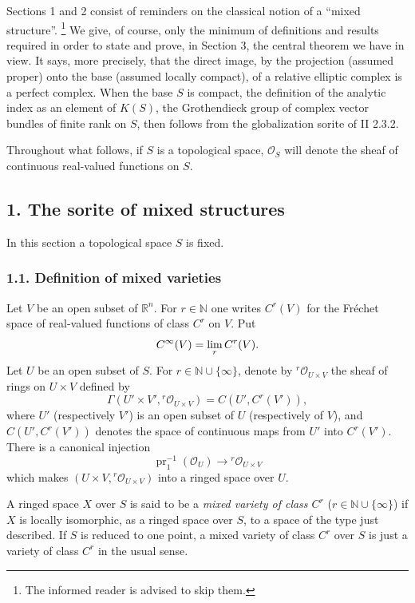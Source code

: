 \documentclass[11pt]{article}
\begin{document}
Sections 1 and 2 consist of reminders on the classical notion of a ``mixed structure''.
\footnote{The informed reader is advised to skip them.}
We give, of course, only the minimum of definitions and results required in order to state and prove, in Section 3, the central theorem we have in view. It says, more precisely, that the direct image, by the projection (assumed proper) onto the base (assumed locally compact), of a relative elliptic complex is a perfect complex. When the base $S$ is compact, the definition of the analytic index as an element of $K(S)$, the Grothendieck group of complex vector bundles of finite rank on $S$, then follows from the globalization sorite of II 2.3.2.

Throughout what follows, if $S$ is a topological space, $\mathcal O_S$ will denote the sheaf of continuous real-valued functions on $S$.

\subsection*{1. The sorite of mixed structures}

In this section a topological space $S$ is fixed.

\subsubsection*{1.1. Definition of mixed varieties}

Let $V$ be an open subset of $\mathbb R^n$. For $r\in\mathbb N$ one writes $C^r(V)$ for the Fréchet space of real-valued functions of class $C^r$ on $V$. Put
\[
 C^\infty(V)=\operatorname*{lim}_r C^r(V).
\]
Let $U$ be an open subset of $S$. For $r\in\mathbb N\cup\{\infty\}$, denote by ${}^r\mathcal O_{U\times V}$ the sheaf of rings on $U\times V$ defined by
\[
 \Gamma(U'\times V',{}^r\mathcal O_{U\times V})
 =C(U',C^r(V')),
\]
where $U'$ (respectively $V'$) is an open subset of $U$ (respectively of $V$), and $C(U',C^r(V'))$ denotes the space of continuous maps from $U'$ into $C^r(V')$. There is a canonical injection
\[
 \operatorname{pr}_1^{-1}(\mathcal O_U)\longrightarrow {}^r\mathcal O_{U\times V}
\]
which makes $(U\times V,{}^r\mathcal O_{U\times V})$ into a ringed space over $U$.

A ringed space $X$ over $S$ is said to be a \emph{mixed variety of class $C^r$} ($r\in\mathbb N\cup\{\infty\}$) if $X$ is locally isomorphic, as a ringed space over $S$, to a space of the type just described. If $S$ is reduced to one point, a mixed variety of class $C^r$ over $S$ is just a variety of class $C^r$ in the usual sense.
\end{document}
